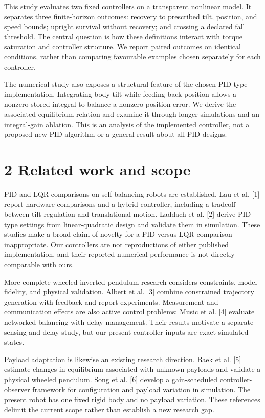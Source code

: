 \documentclass[11pt,a4paper]{article}
\begin{document}
This study evaluates two fixed controllers on a transparent nonlinear model. It separates three finite-horizon outcomes: recovery to prescribed tilt, position, and speed bounds; upright survival without recovery; and crossing a declared fall threshold. The central question is how these definitions interact with torque saturation and controller structure. We report paired outcomes on identical conditions, rather than comparing favourable examples chosen separately for each controller.

The numerical study also exposes a structural feature of the chosen PID-type implementation. Integrating body tilt while feeding back position allows a nonzero stored integral to balance a nonzero position error. We derive the associated equilibrium relation and examine it through longer simulations and an integral-gain ablation. This is an analysis of the implemented controller, not a proposed new PID algorithm or a general result about all PID designs.

\section*{2 Related work and scope}
PID and LQR comparisons on self-balancing robots are established. Lau et al. [1] report hardware comparisons and a hybrid controller, including a tradeoff between tilt regulation and translational motion. Laddach et al. [2] derive PID-type settings from linear-quadratic design and validate them in simulation. These studies make a broad claim of novelty for a PID-versus-LQR comparison inappropriate. Our controllers are not reproductions of either published implementation, and their reported numerical performance is not directly comparable with ours.

More complete wheeled inverted pendulum research considers constraints, model fidelity, and physical validation. Albert et al. [3] combine constrained trajectory generation with feedback and report experiments. Measurement and communication effects are also active control problems: Music et al. [4] evaluate networked balancing with delay management. Their results motivate a separate sensing-and-delay study, but our present controller inputs are exact simulated states.

Payload adaptation is likewise an existing research direction. Baek et al. [5] estimate changes in equilibrium associated with unknown payloads and validate a physical wheeled pendulum. Song et al. [6] develop a gain-scheduled controller-observer framework for configuration and payload variation in simulation. The present robot has one fixed rigid body and no payload variation. These references delimit the current scope rather than establish a new research gap.
\end{document}
